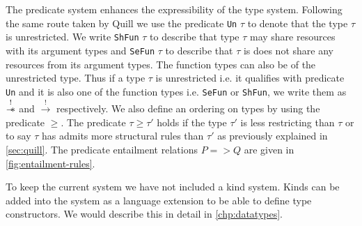 The predicate system enhances the expressibility of the type system. Following the same route taken
by Quill \citep{morris_best_2016} we use the predicate \texttt{Un} $\tau$ to denote
that the type $\tau$ is unrestricted. We write \texttt{ShFun} $\tau$ to describe that type $\tau$ may share resources with its
argument types and \texttt{SeFun} $\tau$ to describe that $\tau$ is
does not share any resources from its argument types. The function types can also be of the unrestricted type.
Thus if a type $\tau$ is unrestricted i.e. it qualifies with predicate \texttt{Un} and it is also one of the function types
i.e. \texttt{SeFun} or \texttt{ShFun}, we write them as $\overset{!}{\mathrel{-\mkern-6mu*}}$ and $\xrightarrow{!}$ respectively.
We also define an ordering on types by using the predicate $\geq$. The predicate $\tau \geq \tau'$ holds if the type $\tau'$
is less restricting than $\tau$ or to say $\tau$ has admits more structural rules than $\tau'$ as previously explained in \cref{sec:quill}.
The predicate entailment relations $P => Q$ are given in \cref{fig:entailment-rules}.

To keep the current system we have not included a kind system. Kinds can be added into the system as a language extension
to be able to define type constructors. We would describe this in detail in \cref{chp:datatypes}.

